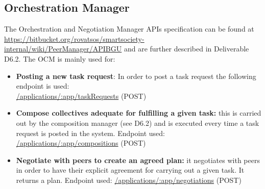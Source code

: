 \subsection{Orchestration Manager}
The Orchestration and Negotiation Manager APIs specification can be found at \url{https://bitbucket.org/rovatsos/smartsociety-internal/wiki/PeerManager/APIBGU} and are further described in Deliverable D6.2. The OCM is mainly used for:
\begin{itemize}
\item {\bf Posting a new task request}: In order to post a task request the following endpoint is used:\\
	\url{/applications/:app/taskRequests} (\textsc{POST})
\item {\bf Compose collectives adequate for fulfilling a given task:} this is carried out by the composition manager (see D6.2) and is executed every time a task request is posted in the system. Endpoint used:
  \url{/applications/:app/compositions} (\textsc{POST})
\item {\bf Negotiate with peers to create an agreed plan:} it negotiates with peers in order to have their explicit agreement for carrying out a given task. It returns a plan. Endpoint used:
  \url{/applications/:app/negotiations} (\textsc{POST})
  
\end{itemize}
